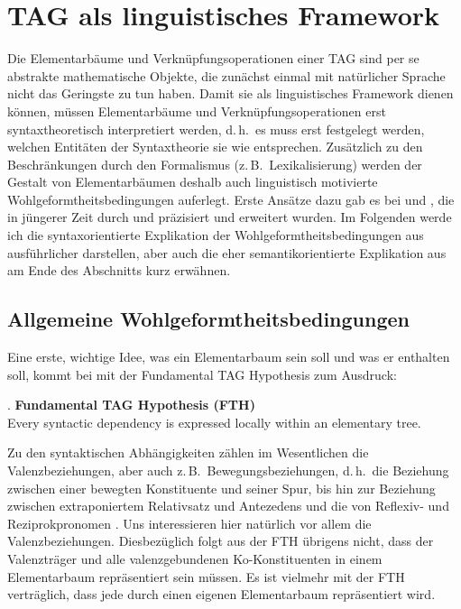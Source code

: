 \section{TAG als linguistisches Framework} \label{sec-tag-ling}

Die Elementarbäume und Verknüpfungsoperationen einer TAG sind per se abstrakte mathematische Objekte, die zunächst einmal mit natürlicher Sprache nicht das Geringste zu tun haben. Damit sie als linguistisches Framework dienen können, müssen Elementarbäume und Verknüpfungsoperationen erst syntaxtheoretisch interpretiert werden, d.\,h.\ es muss erst festgelegt werden, welchen Entitäten der Syntaxtheorie sie wie entsprechen. Zusätzlich zu den Beschränkungen durch den Formalismus (z.\,B.\ Lexikalisierung) werden der Gestalt von Elementarbäumen deshalb auch linguistisch motivierte Wohlgeformtheitsbedingungen auferlegt. Erste Ansätze dazu gab es bei \cite{Abeille:88,Abeille:88b} und \cite{Frank:92}, die in jüngerer Zeit durch \cite{Abeille:Rambow:00} und \cite{Frank:02} präzisiert und erweitert wurden. Im Folgenden werde ich die syntaxorientierte Explikation der Wohlgeformtheitsbedingungen aus \cite{Frank:02} ausführlicher darstellen, aber auch die eher semantikorientierte Explikation aus \cite{Abeille:Rambow:00} am Ende des Abschnitts kurz erwähnen.%

\subsection{Allgemeine Wohlgeformtheitsbedingungen}

Eine erste, wichtige Idee, was ein Elementarbaum sein soll und was er enthalten soll, kommt bei \cite{Frank:02} mit der Fundamental TAG Hypothesis zum Ausdruck: 

\ex. {\bf Fundamental TAG Hypothesis (FTH)} \\
Every syntactic dependency is expressed locally within an elementary tree.
\citep[22]{Frank:02}

Zu den syntaktischen Abhängigkeiten zählen im Wesentlichen die Valenzbeziehungen, aber auch z.\,B.\ Bewegungsbeziehungen, d.\,h.\ die Beziehung zwischen einer bewegten Konstituente und seiner Spur, bis hin zur Beziehung zwischen extraponiertem Relativsatz und Antezedens \citep{Kroch:Joshi:87} und die  von Reflexiv- und Reziprokpronomen \citep{Ryant:Scheffler:06,Kallmeyer:Romero:07,Champollion:08}. Uns interessieren hier natürlich vor allem die Valenzbeziehungen. Diesbezüglich folgt aus der FTH übrigens nicht, dass der Valenzträger und alle valenzgebundenen Ko-Konstituenten in einem Elementarbaum repräsentiert sein müssen. Es ist vielmehr mit der FTH verträglich, dass jede  durch einen eigenen Elementarbaum repräsentiert wird. 

